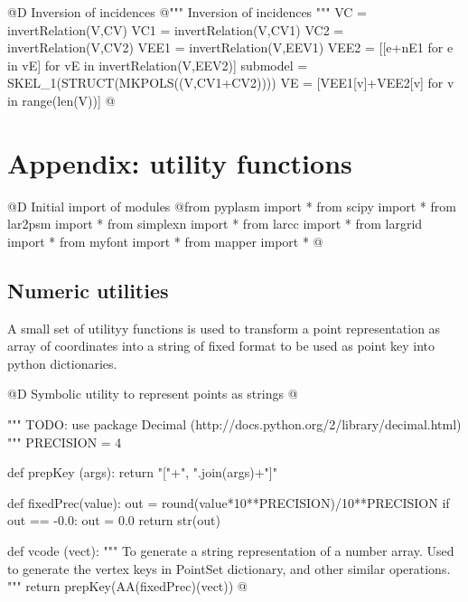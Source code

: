 \documentclass[11pt,oneside]{article}	%
\begin{document}
@D Inversion of incidences
@{""" Inversion of incidences """
VC = invertRelation(V,CV)
VC1 = invertRelation(V,CV1)
VC2 = invertRelation(V,CV2)
VEE1 = invertRelation(V,EEV1)
VEE2 = [[e+nE1  for e in vE] for vE in invertRelation(V,EEV2)]
submodel = SKEL_1(STRUCT(MKPOLS((V,CV1+CV2))))
VE = [VEE1[v]+VEE2[v] for v in range(len(V))]
@}


\appendix
\section{Appendix: utility functions}
@D Initial import of modules
@{from pyplasm import *
from scipy import *
from lar2psm import *
from simplexn import *
from larcc import *
from largrid import *
from myfont import *
from mapper import *
@}
\subsection{Numeric utilities}

A small set of utilityy functions is used to transform a point representation as array of coordinates into a string of fixed format to be used as point key into python dictionaries.

@D Symbolic utility to represent points as strings
@{""" TODO: use package Decimal (http://docs.python.org/2/library/decimal.html) """
PRECISION = 4 

def prepKey (args): return "["+", ".join(args)+"]"

def fixedPrec(value):
	out = round(value*10**PRECISION)/10**PRECISION
	if out == -0.0: out = 0.0
	return str(out)
	
def vcode (vect): 
	"""
	To generate a string representation of a number array.
	Used to generate the vertex keys in PointSet dictionary, and other similar operations.
	"""
	return prepKey(AA(fixedPrec)(vect))
@}




\end{document}
